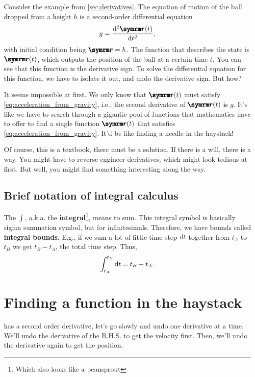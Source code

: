 Consider the example from \cref{sec:derivatives}. The equation of motion of the ball dropped from a height $h$ is a second-order differential equation
\begin{equation}
    g = \odv[ord = 2]{\vv{r}(t)}{t}, \label{eq:acceleration_from_gravity}
\end{equation}
with initial condition being $\vv{r} = h$. The function that describes the state is $\vv{r}(t)$, which outputs the position of the ball at a certain time $t$. You can see that this function is the derivative sign. To solve the differential equation for this function, we have to isolate it out, and undo the derivative sign. But how?

It seems impossible at first. We only know that $\vv{r}(t)$ must satisfy \cref{eq:acceleration_from_gravity}, i.e., the second derivative of $\vv{r}(t)$ is $g$. It's like we have to search through a gigantic pool of functions that mathematics have to offer to find a single function $\vv{r}(t)$ that satisfies \cref{eq:acceleration_from_gravity}. It'd be like finding a needle in the haystack!

Of course, this is a textbook, there must be a solution. If there is a will, there is a way. You might have to reverse engineer derivatives, which might look tedious at first. But well, you might find something interesting along the way.

\subsection{Brief notation of integral calculus}
\label{sec:brief_notation_of_calculus_integral}

The $\int$, a.k.a. the \textbf{integral}\footnote{Which also looks like a beansprout}, means to sum. This integral symbol is basically sigma summation symbol, but for infinitesimals. Therefore, we have bounds called \textbf{integral bounds}. E.g., if we sum a lot of little time step $\odif{t}$ together from $t_A$ to $t_B$ we get $t_B - t_A$, the total time step. Thus,
\begin{equation}
    \int_{t_A}^{t_B}\odif{t} = t_B - t_A.
\end{equation}

\section{Finding a function in the haystack}
\label{sec:function_in_the_haystack}

 has a second order derivative, let's go slowly and undo one derivative at a time. We'll undo the derivative of the R.H.S. to get the velocity first. Then, we'll undo the derivative again to get the position.


